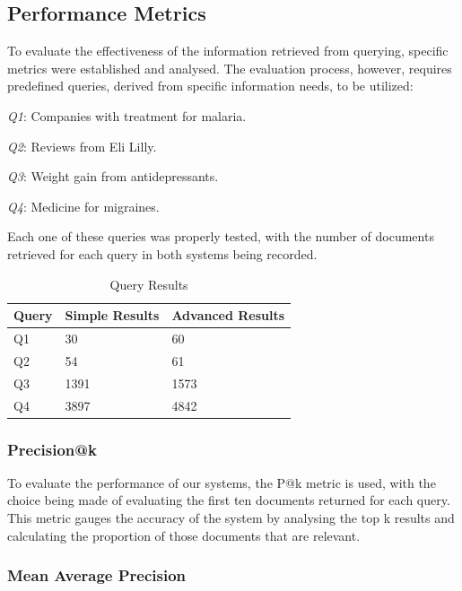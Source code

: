 \documentclass[sigconf]{acmart}
\begin{document}
\subsection{Performance Metrics}

To evaluate the effectiveness of the information retrieved from querying, specific metrics were established and analysed. The evaluation process, however, requires predefined queries, derived from specific information needs, to be utilized:

\begin{arrowlist}
	\item \textit{Q1}: Companies with treatment for malaria.
	\item \textit{Q2}: Reviews from Eli Lilly.
	\item \textit{Q3}: Weight gain from antidepressants.
	\item \textit{Q4}: Medicine for migraines.
\end{arrowlist}

Each one of these queries was properly tested, with the number of documents retrieved for each query in both systems being recorded.

\begin{table}[H]
	\begin{tabular}{ | m{5em} | m{1cm}| m{1.2cm} | }
		\hline
		Query& Simple Results & Advanced Results \\
		\hline
		Q1 & 30 & 60 \\
		\hline
		Q2 & 54 & 61 \\
		\hline
		Q3 & 1391 & 1573 \\
		\hline
		Q4 & 3897 & 4842 \\
		\hline
	\end{tabular}
	\caption{Query Results}
	\label{tab:query_results}
\end{table}

\subsubsection{Precision@k}

To evaluate the performance of our systems, the P@k metric\cite{pak} is used, with the choice being made of evaluating the first ten documents returned for each query. This metric gauges the accuracy of the system by analysing the top k results and calculating the proportion of those documents that are relevant.

\subsubsection{Mean Average Precision}
\end{document}
